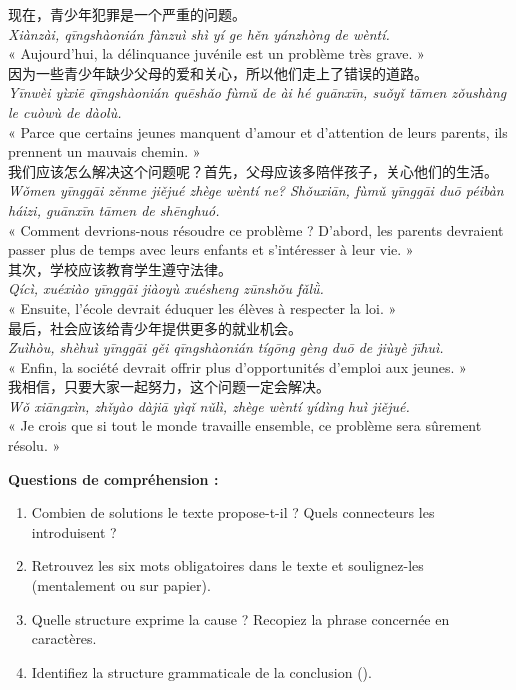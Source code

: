 \documentclass[11pt]{article}
\newcommand{\zh}[1]{\ifmmode\text{#1}\else{#1}\fi}
\begin{document}
\begin{textebox}
现在，青少年犯罪是一个严重的问题。\\
\emph{Xiànzài, qīngshàonián fànzuì shì yí ge hěn yánzhòng de wèntí.}\\
« Aujourd'hui, la délinquance juvénile est un problème très grave. »\\[4pt]
因为一些青少年缺少父母的爱和关心，所以他们走上了错误的道路。\\
\emph{Yīnwèi yìxiē qīngshàonián quēshǎo fùmǔ de ài hé guānxīn, suǒyǐ tāmen zǒushàng le cuòwù de dàolù.}\\
« Parce que certains jeunes manquent d'amour et d'attention de leurs parents, ils prennent un mauvais chemin. »\\[4pt]
我们应该怎么解决这个问题呢？首先，父母应该多陪伴孩子，关心他们的生活。\\
\emph{Wǒmen yīnggāi zěnme jiějué zhège wèntí ne? Shǒuxiān, fùmǔ yīnggāi duō péibàn háizi, guānxīn tāmen de shēnghuó.}\\
« Comment devrions-nous résoudre ce problème ? D'abord, les parents devraient passer plus de temps avec leurs enfants et s'intéresser à leur vie. »\\[4pt]
其次，学校应该教育学生遵守法律。\\
\emph{Qícì, xuéxiào yīnggāi jiàoyù xuésheng zūnshǒu fǎlǜ.}\\
« Ensuite, l'école devrait éduquer les élèves à respecter la loi. »\\[4pt]
最后，社会应该给青少年提供更多的就业机会。\\
\emph{Zuìhòu, shèhuì yīnggāi gěi qīngshàonián tígōng gèng duō de jiùyè jīhuì.}\\
« Enfin, la société devrait offrir plus d'opportunités d'emploi aux jeunes. »\\[4pt]
我相信，只要大家一起努力，这个问题一定会解决。\\
\emph{Wǒ xiāngxìn, zhǐyào dàjiā yìqǐ nǔlì, zhège wèntí yídìng huì jiějué.}\\
« Je crois que si tout le monde travaille ensemble, ce problème sera sûrement résolu. »
\end{textebox}

\textbf{Questions de compréhension :}
\begin{enumerate}
\item Combien de solutions le texte propose-t-il ? Quels connecteurs les introduisent ?
\item Retrouvez les six mots obligatoires dans le texte et soulignez-les (mentalement ou sur papier).
\item Quelle structure exprime la cause ? Recopiez la phrase concernée en caractères.
\item Identifiez la structure grammaticale de la conclusion (\zh{只要...会...}).
\end{enumerate}
\end{document}
